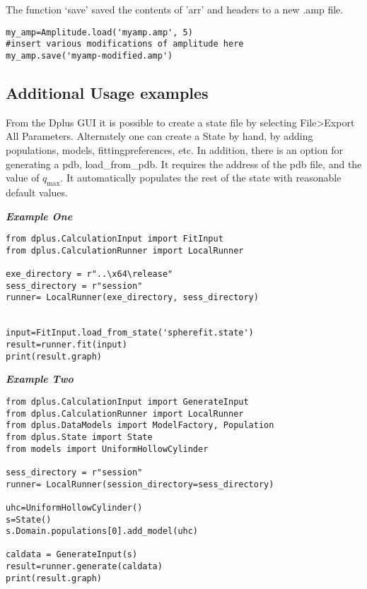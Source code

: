 \documentclass[../D+Manual.tex]{subfiles}
\begin{document}
The function `save' saved the contents of 'arr' and headers to a new .amp
file.

\begin{lstlisting}[style=pythonstyle]
my_amp=Amplitude.load('myamp.amp', 5)
#insert various modifications of amplitude here
my_amp.save('myamp-modified.amp')
\end{lstlisting}

\subsection{Additional Usage examples}\label{additional-usage-examples}

From the Dplus GUI it is possible to create a state file by selecting
File\textgreater{}Export All Parameters. Alternately one can create a
State by hand, by adding populations, models, fittingpreferences, etc.
In addition, there is an option for generating a pdb, load\_from\_pdb.
It requires the address of the pdb file, and the value of $q_{\text{max}}$. It automatically populates the rest of the state with
reasonable default values.

\textbf{\emph{Example One}}

\begin{lstlisting}[style=pythonstyle]
from dplus.CalculationInput import FitInput
from dplus.CalculationRunner import LocalRunner

exe_directory = r"..\x64\release"
sess_directory = r"session"
runner= LocalRunner(exe_directory, sess_directory)


input=FitInput.load_from_state('spherefit.state')
result=runner.fit(input)
print(result.graph)
\end{lstlisting}

\textbf{\emph{Example Two}}

\begin{lstlisting}[style=pythonstyle]
from dplus.CalculationInput import GenerateInput
from dplus.CalculationRunner import LocalRunner
from dplus.DataModels import ModelFactory, Population
from dplus.State import State
from models import UniformHollowCylinder

sess_directory = r"session"
runner= LocalRunner(session_directory=sess_directory)

uhc=UniformHollowCylinder()
s=State()
s.Domain.populations[0].add_model(uhc)

caldata = GenerateInput(s)
result=runner.generate(caldata)
print(result.graph)
\end{lstlisting}
\end{document}
